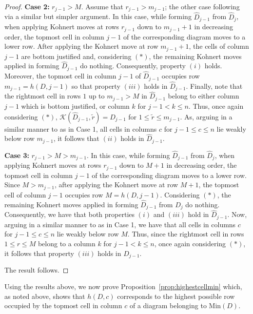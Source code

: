\documentclass[letterpaper,10pt]{article}
\begin{document}
\begin{proof}
    \noindent
    \textbf{Case 2:} $r_{j-1}>M$. Assume that $r_{j-1}>m_{j-1}$; the other case following via a similar but simpler argument. In this case, while forming $\widehat{D}_{j-1}$ from $\widehat{D}_{j}$, when applying Kohnert moves at rows $r_{j-1}$ down to $m_{j-1}+1$ in decreasing order, the topmost cell in column $j-1$ of the corresponding diagram moves to a lower row. After applying the Kohnert move at row $m_{j-1}+1$, the cells of column $j-1$ are bottom justified and, considering $(\ast)$, the remaining Kohnert moves applied in forming $\widehat{D}_{j-1}$ do nothing. Consequently, property $(i)$ holds. Moreover, the topmost cell in column $j-1$ of $\widehat{D}_{j-1}$ occupies row $m_{j-1}=h(D,j-1)$ so that property $(iii)$ holds in $\widehat{D}_{j-1}$. Finally, note that the rightmost cell in rows $1$ up to $m_{j-1}>M$ in $\widehat{D}_{j-1}$ belong to either column $j-1$ which is bottom justified, or column $k$ for $j-1<k\le n$. Thus, once again considering $(\ast)$, $\mathcal{K}(\widehat{D}_{j-1},\tilde{r})=\widehat{D}_{j-1}$ for $1\le \tilde{r}\le m_{j-1}$. As, arguing in a similar manner to as in Case 1, all cells in columns $c$ for $j-1\le c\le n$ lie weakly below row $m_{j-1}$, it follows that $(ii)$ holds in $\widehat{D}_{j-1}$.
    \bigskip

    \noindent
    \textbf{Case 3:} $r_{j-1}>M>m_{j-1}$. In this case, while forming $\widehat{D}_{j-1}$ from $\widehat{D}_{j}$, when applying Kohnert moves at rows $r_{j-1}$ down to $M+1$ in decreasing order, the topmost cell in column $j-1$ of the corresponding diagram moves to a lower row. Since $M>m_{j-1}$, after applying the Kohnert move at row $M+1$, the topmost cell of column $j-1$ occupies row $M=h(D,j-1)$. Considering $(\ast)$, the remaining Kohnert moves applied in forming $\widehat{D}_{j-1}$ from $\widehat{D}_{j}$ do nothing. Consequently, we have that both properties $(i)$ and $(iii)$ hold in $\widehat{D}_{j-1}$. Now, arguing in a similar manner to as in Case 1, we have that all cells in columns $c$ for $j-1\le c\le n$ lie weakly below row $M$. Thus, since the rightmost cell in rows $1\le r\le M$ belong to a column $k$ for $j-1<k\le n$, once again considering $(\ast)$, it follows that property $(iii)$ holds in $\widehat{D}_{j-1}$.
    \bigskip

    \noindent
    The result follows.
\end{proof}

Using the results above, we now prove Proposition~\ref{prop:highestcellmin} which, as noted above, shows that $h(D,c)$ corresponds to the highest possible row occupied by the topmost cell in column $c$ of a diagram belonging to $\textrm{Min}(D)$.
\end{document}
